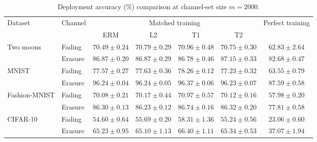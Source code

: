 \begin{table}[htb]
\centering
\caption{Deployment accuracy (\%) comparison at channel-set size $m=2000$.}
\label{tab:performance}
\begin{tabular*}{\linewidth}{@{\extracolsep{\fill}}llccccc@{}}
\toprule
\multirow{2}{*}{Dataset} & \multirow{2}{*}{Channel}
& \multicolumn{4}{c}{Matched training} & \multirow{2}{*}{Perfect training} \\
\cmidrule(lr){3-6}
& & ERM & L2 & T1 & T2 &  \\
\midrule
\multirow{2}{*}{Two moons}
& Fading
& $70.49\pm0.24$ & $70.79\pm0.29$ & $\mathbf{70.96}\pm0.48$ & $70.75\pm0.30$ & $62.83\pm2.64$ \\
& Erasure
& $86.87\pm0.20$ & $86.87\pm0.29$ & $86.78\pm0.46$ & $\mathbf{87.15}\pm0.33$ & $82.68\pm0.47$ \\
\midrule
\multirow{2}{*}{MNIST}
& Fading
& $77.57\pm0.27$ & $77.63\pm0.36$ & $\mathbf{78.26}\pm0.12$ & $77.23\pm0.32$ & $63.55\pm0.79$ \\
& Erasure
& $96.24\pm0.04$ & $96.24\pm0.05$ & $\mathbf{96.37}\pm0.06$ & $96.23\pm0.07$ & $87.59\pm0.58$ \\
\midrule
\multirow{2}{*}{Fashion-MNIST}
& Fading
& $70.08\pm0.21$ & $70.17\pm0.44$ & $\mathbf{70.97}\pm0.57$ & $70.12\pm0.16$ & $57.98\pm0.20$ \\
& Erasure
& $86.30\pm0.13$ & $86.23\pm0.12$ & $\mathbf{86.74}\pm0.16$ & $86.32\pm0.20$ & $77.81\pm0.58$ \\
\midrule
\multirow{2}{*}{CIFAR-10}
& Fading
& $54.60\pm0.64$ & $55.69\pm0.20$ & $\mathbf{58.31}\pm1.36$ & $55.24\pm0.56$ & $23.06\pm0.60$ \\
& Erasure
& $65.23\pm0.95$ & $65.10\pm1.13$ & $\mathbf{66.40}\pm1.11$ & $65.34\pm0.53$ & $37.07\pm1.94$ \\
\bottomrule
\end{tabular*}
\end{table}
